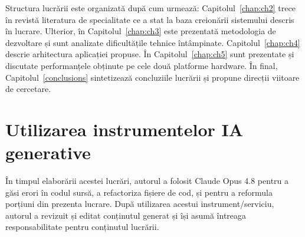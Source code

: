 Structura lucrării este organizată după cum urmează: Capitolul~\ref{chap:ch2} trece în revistă literatura de specialitate ce a stat la baza creionării sistemului descris în lucrare. Ulterior, în Capitolul~\ref{chap:ch3} este prezentată metodologia de dezvoltare și sunt analizate dificultățile tehnice întâmpinate. Capitolul~\ref{chap:ch4} descrie arhitectura aplicației propuse. În Capitolul~\ref{chap:ch5} sunt prezentate și discutate performanțele obținute pe cele două platforme hardware. În final, Capitolul~\ref{conclusions} sintetizează concluziile lucrării și propune direcții viitoare de cercetare.

\section{Utilizarea instrumentelor IA generative}
\label{sec:ai_usage}

În timpul elaborării acestei lucrări, autorul a folosit Claude Opus 4.8 pentru a găsi erori în codul sursă, a refactoriza fișiere de cod, și pentru a reformula porțiuni din prezenta lucrare. După utilizarea acestui instrument/serviciu, autorul a revizuit și editat conținutul generat și își asumă întreaga responsabilitate pentru conținutul lucrării.
